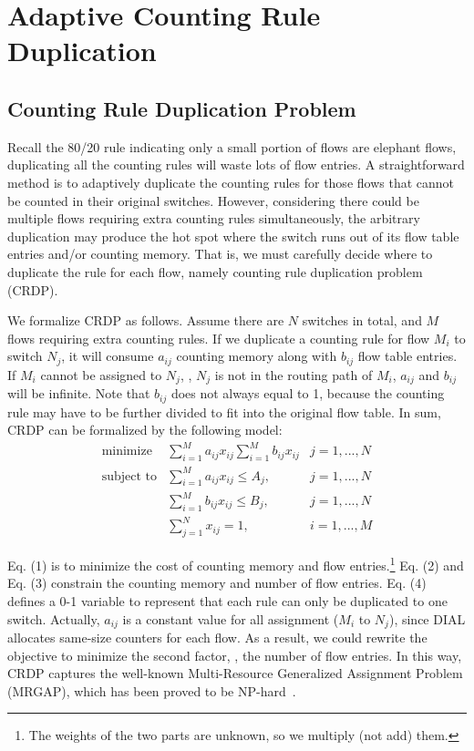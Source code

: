 \section{Adaptive Counting Rule Duplication}\label{sec:dup}
\subsection{Counting Rule Duplication Problem}\label{sec:dup-prob}
Recall the 80/20 rule indicating only a small portion of flows are elephant flows, duplicating all the counting rules will waste lots of flow entries.
A straightforward method is to adaptively duplicate the counting rules for those flows that cannot be counted in their original switches.
However, considering there could be multiple flows requiring extra counting rules simultaneously, the arbitrary duplication may produce the hot spot where the switch runs out of its flow table entries and/or counting memory.
That is, we must carefully decide where to duplicate the rule for each flow, namely counting rule duplication problem (CRDP).

We formalize CRDP as follows.
Assume there are $N$ switches in total, and $M$ flows requiring extra counting rules.
If we duplicate a counting rule for flow $M_i$ to switch $N_j$, it will consume $a_{ij}$ counting memory along with $b_{ij}$ flow table entries.
If $M_i$ cannot be assigned to $N_j$, \ie, $N_j$ is not in the routing path of $M_i$, $a_{ij}$ and $b_{ij}$ will be infinite.
Note that $b_{ij}$ does not always equal to 1, because the counting rule may have to be further divided to fit into the original flow table.
In sum, CRDP can be formalized by the following model:
\begin{eqnarray}
\text{minimize}  & \displaystyle\sum\limits^{M}_{i=1} a_{ij}x_{ij}\sum\limits^{M}_{i=1} b_{ij}x_{ij} & j=1,...,N\\
\text{subject to}& \displaystyle\sum\limits^{M}_{i=1} a_{ij}x_{ij}\leq A_j,  & j=1,...,N \\
                 & \displaystyle\sum\limits^{M}_{i=1} b_{ij}x_{ij}\leq B_j,  & j=1,...,N \\
                 & \displaystyle\sum\limits^{N}_{j=1}x_{ij}=1,  & i=1,...,M
\end{eqnarray}

Eq. (1) is to minimize the cost of counting memory and flow entries.\footnote{The weights of the two parts are unknown, so we multiply (not add) them.}
Eq. (2) and Eq. (3) constrain the counting memory and number of flow entries.
Eq. (4) defines a 0-1 variable to represent that each rule can only be duplicated to one switch.
Actually, $a_{ij}$ is a constant value for all assignment ($M_i$ to $N_j$), since DIAL allocates same-size counters for each flow.
As a result, we could rewrite the objective to minimize the second factor, \ie, the number of flow entries.
In this way, CRDP captures the well-known Multi-Resource Generalized Assignment Problem (MRGAP), which has been proved to be NP-hard~\cite{doi:10.1287/mnsc.37.6.695}.

